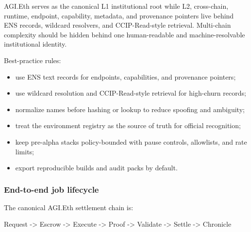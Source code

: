 \documentclass[
  11pt,
]{article}
\newenvironment{Shaded}{}{}
\newcommand{\NormalTok}[1]{#1}
\providecommand{\tightlist}{%
  \setlength{\itemsep}{0pt}\setlength{\parskip}{0pt}}
\begin{document}
AGI.Eth serves as the canonical L1 institutional root while L2,
cross-chain, runtime, endpoint, capability, metadata, and provenance
pointers live behind ENS records, wildcard resolvers, and
CCIP-Read-style retrieval. Multi-chain complexity should be hidden
behind one human-readable and machine-resolvable institutional identity.

Best-practice rules:

\begin{itemize}
\tightlist
\item
  use ENS text records for endpoints, capabilities, and provenance
  pointers;
\item
  use wildcard resolution and CCIP-Read-style retrieval for high-churn
  records;
\item
  normalize names before hashing or lookup to reduce spoofing and
  ambiguity;
\item
  treat the environment registry as the source of truth for official
  recognition;
\item
  keep pre-alpha stacks policy-bounded with pause controls, allowlists,
  and rate limits;
\item
  export reproducible builds and audit packs by default.
\end{itemize}

\subsubsection{End-to-end job lifecycle}\label{end-to-end-job-lifecycle}

The canonical AGI.Eth settlement chain is:

\begin{Shaded}
\begin{Highlighting}[]
\NormalTok{Request {-}\textgreater{} Escrow {-}\textgreater{} Execute {-}\textgreater{} Proof {-}\textgreater{} Validate {-}\textgreater{} Settle {-}\textgreater{} Chronicle}
\end{Highlighting}
\end{Shaded}
\end{document}
